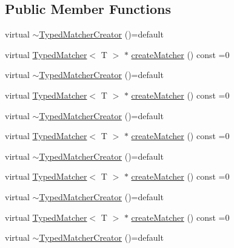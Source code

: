 \subsection*{Public Member Functions}
\begin{DoxyCompactItemize}
\item 
virtual \mbox{\hyperlink{structfakeit_1_1TypedMatcherCreator_afe705f26e562bceace38fcf1c5e057d0}{$\sim$\+Typed\+Matcher\+Creator}} ()=default
\item 
virtual \mbox{\hyperlink{structfakeit_1_1TypedMatcher}{Typed\+Matcher}}$<$ T $>$ $\ast$ \mbox{\hyperlink{structfakeit_1_1TypedMatcherCreator_a40646cd11f8acf5c34b971f396891d5c}{create\+Matcher}} () const =0
\item 
virtual \mbox{\hyperlink{structfakeit_1_1TypedMatcherCreator_afe705f26e562bceace38fcf1c5e057d0}{$\sim$\+Typed\+Matcher\+Creator}} ()=default
\item 
virtual \mbox{\hyperlink{structfakeit_1_1TypedMatcher}{Typed\+Matcher}}$<$ T $>$ $\ast$ \mbox{\hyperlink{structfakeit_1_1TypedMatcherCreator_a40646cd11f8acf5c34b971f396891d5c}{create\+Matcher}} () const =0
\item 
virtual \mbox{\hyperlink{structfakeit_1_1TypedMatcherCreator_afe705f26e562bceace38fcf1c5e057d0}{$\sim$\+Typed\+Matcher\+Creator}} ()=default
\item 
virtual \mbox{\hyperlink{structfakeit_1_1TypedMatcher}{Typed\+Matcher}}$<$ T $>$ $\ast$ \mbox{\hyperlink{structfakeit_1_1TypedMatcherCreator_a40646cd11f8acf5c34b971f396891d5c}{create\+Matcher}} () const =0
\item 
virtual \mbox{\hyperlink{structfakeit_1_1TypedMatcherCreator_afe705f26e562bceace38fcf1c5e057d0}{$\sim$\+Typed\+Matcher\+Creator}} ()=default
\item 
virtual \mbox{\hyperlink{structfakeit_1_1TypedMatcher}{Typed\+Matcher}}$<$ T $>$ $\ast$ \mbox{\hyperlink{structfakeit_1_1TypedMatcherCreator_a40646cd11f8acf5c34b971f396891d5c}{create\+Matcher}} () const =0
\item 
virtual \mbox{\hyperlink{structfakeit_1_1TypedMatcherCreator_afe705f26e562bceace38fcf1c5e057d0}{$\sim$\+Typed\+Matcher\+Creator}} ()=default
\item 
virtual \mbox{\hyperlink{structfakeit_1_1TypedMatcher}{Typed\+Matcher}}$<$ T $>$ $\ast$ \mbox{\hyperlink{structfakeit_1_1TypedMatcherCreator_a40646cd11f8acf5c34b971f396891d5c}{create\+Matcher}} () const =0
\item 
virtual \mbox{\hyperlink{structfakeit_1_1TypedMatcherCreator_afe705f26e562bceace38fcf1c5e057d0}{$\sim$\+Typed\+Matcher\+Creator}} ()=default

\end{DoxyCompactItemize}
